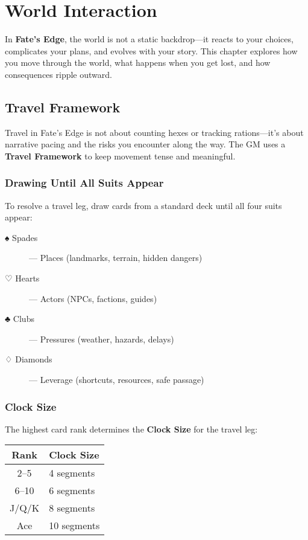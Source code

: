 
\chapter{World Interaction}

In \textbf{Fate’s Edge}, the world is not a static backdrop—it reacts to your choices, complicates your plans, and evolves with your story. This chapter explores how you move through the world, what happens when you get lost, and how consequences ripple outward.

\section{Travel Framework}

Travel in Fate’s Edge is not about counting hexes or tracking rations—it’s about narrative pacing and the risks you encounter along the way. The GM uses a \textbf{Travel Framework} to keep movement tense and meaningful.

\subsection*{Drawing Until All Suits Appear}

To resolve a travel leg, draw cards from a standard deck until all four suits appear:

\begin{description}
  \item[♠ Spades] — Places (landmarks, terrain, hidden dangers)
  \item[♡ Hearts] — Actors (NPCs, factions, guides)
  \item[♣ Clubs] — Pressures (weather, hazards, delays)
  \item[♢ Diamonds] — Leverage (shortcuts, resources, safe passage)
\end{description}

\subsection*{Clock Size}

The highest card rank determines the \textbf{Clock Size} for the travel leg:

\begin{center}
\begin{tabular}{cl}
\toprule
\textbf{Rank} & \textbf{Clock Size} \\
\midrule
2–5 & 4 segments \\
6–10 & 6 segments \\
J/Q/K & 8 segments \\
Ace & 10 segments \\
\bottomrule
\end{tabular}
\end{center}

